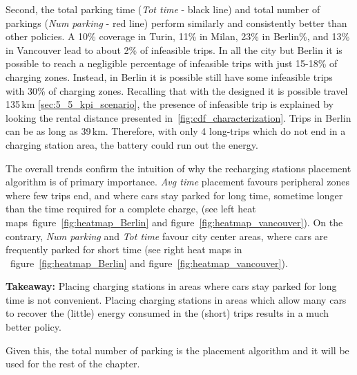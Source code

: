 Second, the total parking time  (\textit{Tot time} - black line) and total number of parkings (\textit{Num parking} - red line) perform similarly and consistently better than other policies. A 10\% coverage in Turin, 11\% in Milan, 23\% in Berlin\%, and 13\% in Vancouver lead to about 2\% of infeasible trips. 
In all the city but Berlin it is possible to reach a negligible percentage of infeasible trips with just 15-18\% of charging zones. Instead, in Berlin it is possible still have some infeasible trips with 30\% of charging zones. Recalling that with the designed it is possible travel 135\,km \ref{sec:5_5_kpi_scenario}, the presence of infeasible trip is explained by looking the rental distance presented in~\ref{fig:cdf_characterization}. Trips in Berlin can be as long as 39\,km. Therefore, with only 4 long-trips which do not end in a charging station area, the battery could run out the energy.

The overall trends confirm the intuition of why the recharging stations placement algorithm is of primary importance. \textit{Avg time} placement favours peripheral zones where few trips end, and where cars stay parked for long time, sometime longer than the time required for a complete charge, (see left heat maps~figure~\ref{fig:heatmap_Berlin} and figure~\ref{fig:heatmap_vancouver}). On the contrary, \textit{Num parking} and \textit{Tot time} favour city center areas, where cars are frequently parked for short time (see right heat maps in ~figure~\ref{fig:heatmap_Berlin} and figure~\ref{fig:heatmap_vancouver}). 

\textbf{Takeaway:} Placing charging stations in areas where cars stay parked for long time is not convenient. Placing charging stations in areas which allow many cars to recover the (little) energy consumed in the (short) trips results in a much better policy.

Given this, the total number of parking is the placement algorithm and it will be used for the rest of the chapter. 

